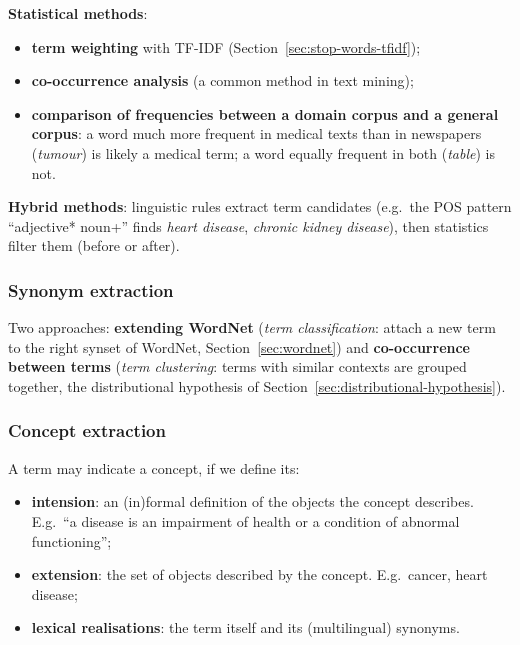\textbf{Statistical methods}:
\begin{itemize}[nosep]
  \item \textbf{term weighting} with TF-IDF (Section~\ref{sec:stop-words-tfidf});
  \item \textbf{co-occurrence analysis} (a common method in text mining);
  \item \textbf{comparison of frequencies between a domain corpus and a general corpus}:
        a word much more frequent in medical texts than in newspapers (\emph{tumour}) is
        likely a medical term; a word equally frequent in both (\emph{table}) is not.
\end{itemize}

\textbf{Hybrid methods}: linguistic rules extract term candidates (e.g.\ the POS pattern
``adjective* noun+'' finds \emph{heart disease}, \emph{chronic kidney disease}), then
statistics filter them (before or after).

\subsubsection{Synonym extraction}

Two approaches: \textbf{extending WordNet} (\emph{term classification}: attach a new
term to the right synset of WordNet, Section~\ref{sec:wordnet}) and
\textbf{co-occurrence between terms} (\emph{term clustering}: terms with similar
contexts are grouped together, the distributional hypothesis of
Section~\ref{sec:distributional-hypothesis}).

\subsubsection{Concept extraction}

A term may indicate a concept, if we define its:
\begin{itemize}[nosep]
  \item \textbf{intension}: an (in)formal definition of the objects the concept
        describes. E.g.\ ``a disease is an impairment of health or a condition of
        abnormal functioning'';
  \item \textbf{extension}: the set of objects described by the concept. E.g.\ cancer,
        heart disease;
  \item \textbf{lexical realisations}: the term itself and its (multilingual)
        synonyms.
\end{itemize}

